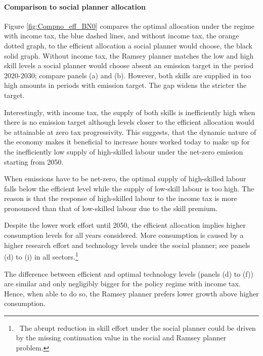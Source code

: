 \paragraph{Comparison to social planner allocation}
Figure \ref{fig:Compno_eff_BN0} compares the optimal allocation under the regime with income tax, the blue dashed lines, and without income tax, the orange dotted graph, to the efficient allocation  a social planner would choose, the black solid graph. 
Without income tax, the Ramsey planner matches the low and high skill levels a social planner would choose absent an emission target in the period 2020-2030; compare panels (a) and (b). However, both skills are supplied in too high amounts in periods with emission target. The gap widens the stricter the target. 

Interestingly, with income tax, the supply of both skills is inefficiently high when there is no emission target although levels closer to the efficient allocation would be attainable at zero tax progressivity. This suggests, that the dynamic nature of the economy makes it beneficial to increase hours worked today to make up for the inefficiently low supply of high-skilled labour under the net-zero emission starting from 2050. 

When emissions have to be net-zero, the optimal supply of high-skilled labour falls below the efficient level while the supply of low-skill labour is too high. The reason is that the response of high-skilled labour to the income tax is more pronounced than that of low-skilled labour due to the skill premium. 

Despite the lower work effort until 2050, the efficient allocation implies higher consumption levels for all years considered. More consumption is caused by a higher research effort and technology levels under the social planner; see panels (d) to (i) in all sectors.\footnote{\ The abrupt reduction in skill effort under the social planner could be driven by the missing continuation value in the social and Ramsey planner problem. }

The difference between efficient and optimal technology levels (panels (d) to (f)) are similar and only negligibly bigger for the policy regime with income tax. Hence, when able to do so, the Ramsey planner prefers lower growth above higher consumption. 
 
